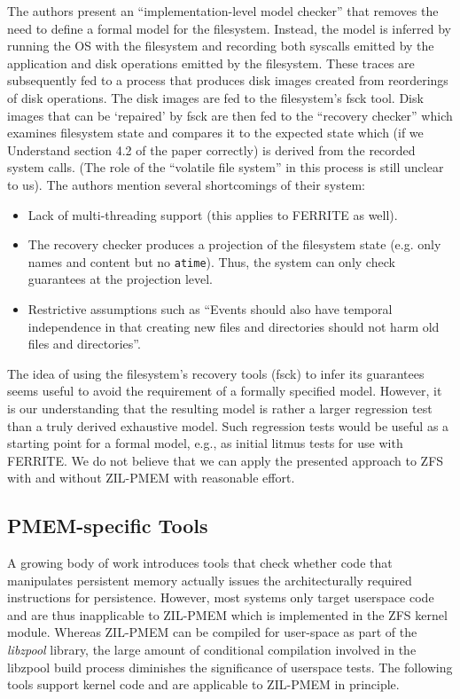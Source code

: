 \documentclass[12pt,a4paper,twoside]{book}
\begin{document}
The authors present an “implementation-level model checker” that removes the need to define a formal model for the filesystem.
Instead, the model is inferred by running the OS with the filesystem and recording both syscalls emitted by the application and disk operations emitted by the filesystem.
These traces are subsequently fed to a process that produces disk images created from reorderings of disk operations.
The disk images are fed to the filesystem’s fsck tool.
Disk images that can be ‘repaired’ by fsck are then fed to the “recovery checker” which examines filesystem state and compares it to the expected state which (if we Understand section 4.2 of the paper correctly) is derived from the recorded system calls.
(The role of the “volatile file system” in this process is still unclear to us).
The authors mention several shortcomings of their system:
\begin{itemize}[noitemsep,beginpenalty=100000,midpenalty=100000]
    \item Lack of multi-threading support (this applies to FERRITE as well).
    \item The recovery checker produces a projection of the filesystem state (e.g. only names and content but no \lstinline{atime}).
          Thus, the system can only check guarantees at the projection level.
    \item Restrictive assumptions such as “Events should also have temporal independence in that creating new files and directories should not harm old files and directories”.
\end{itemize}
The idea of using the filesystem’s recovery tools (fsck) to infer its guarantees seems useful to avoid the requirement of a formally specified model.
However, it is our understanding that the resulting model is rather a larger regression test than a truly derived exhaustive model.
Such regression tests would be useful as a starting point for a formal model, e.g., as initial litmus tests for use with FERRITE.
We do not believe that we can apply the presented approach to ZFS with and without ZIL-PMEM with reasonable effort.

\subsection{PMEM-specific Tools}\label{sec:rel_work:pmemspecifictools}
A growing body of work introduces tools that check whether code that manipulates persistent memory actually issues the architecturally required instructions for persistence.
However, most systems only target userspace code and are thus inapplicable to ZIL-PMEM which is implemented in the ZFS kernel module.
Whereas ZIL-PMEM can be compiled for user-space as part of the \textit{libzpool} library, the large amount of conditional compilation involved in the libzpool build process diminishes the significance of userspace tests.
The following tools support kernel code and are applicable to ZIL-PMEM in principle.
\end{document}
